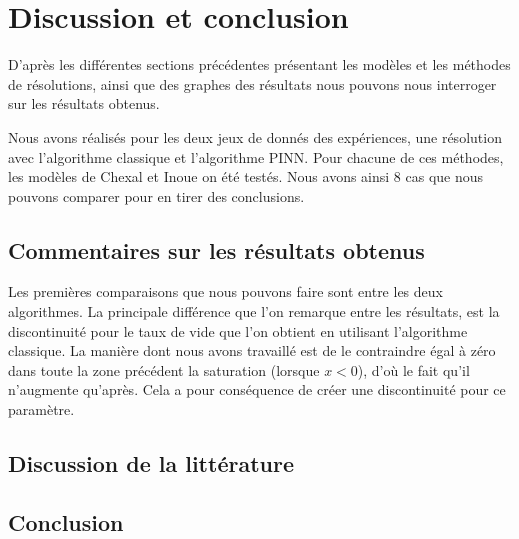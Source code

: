 \section{Discussion et conclusion}
D'après les différentes sections précédentes présentant les modèles et les méthodes de résolutions, ainsi que des graphes des résultats nous pouvons nous interroger sur les résultats obtenus.\\ \par
Nous avons réalisés pour les deux jeux de donnés des expériences, une résolution avec l'algorithme classique et l'algorithme PINN. Pour chacune de ces méthodes, les modèles de Chexal et Inoue on été testés. Nous avons ainsi 8 cas que nous pouvons comparer pour en tirer des conclusions.
\subsection{Commentaires sur les résultats obtenus}
Les premières comparaisons que nous pouvons faire sont entre les deux algorithmes. La principale différence que l'on remarque entre les résultats, est la discontinuité pour le taux de vide que l'on obtient en utilisant l'algorithme classique. La manière dont nous avons travaillé est de le contraindre égal à zéro dans toute la zone précédent la saturation (lorsque $x<0$), d'où le fait qu'il n'augmente qu'après. Cela a pour conséquence de créer une discontinuité pour ce paramètre.\\ \par


\subsection{Discussion  de la littérature}

\subsection{Conclusion}

